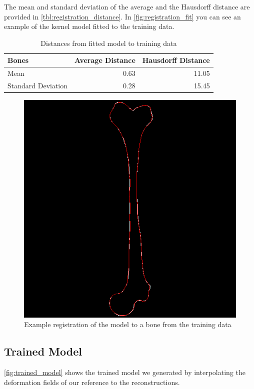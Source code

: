 The mean and standard deviation of the average and the Hausdorff distance are provided in \autoref{tbl:registration_distance}.
In \autoref{fig:registration_fit} you can see an example of the kernel model fitted to the training data.

\begin{table}
\centering
\caption{Distances from fitted model to training data}
\label{tbl:registration_distance}
\begin{tabular}{lrr}
\toprule
\textbf{Bones} &
Average Distance &
Hausdorff Distance \\
\midrule
Mean& 0.63 & 11.05 \\
Standard Deviation& 0.28 & 15.45 \\
\bottomrule
\end{tabular}
\end{table}

\begin{figure}
	\centering
  \includegraphics[scale=0.7]{./Figures/registration_fit}
  \caption{Example registration of the model to a bone from the training data}
  \label{fig:registration_fit}
\end{figure}


\subsection{Trained Model}
\label{subsec:trainedmodel}
\autoref{fig:trained_model} shows the trained model we generated by interpolating the deformation fields of our reference to the reconstructions.

